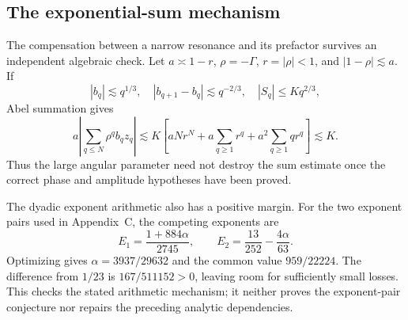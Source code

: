 \documentclass[10pt]{article}
\begin{document}
\subsection*{The exponential-sum mechanism}
The compensation between a narrow resonance and its prefactor survives an independent algebraic check. Let \(a\asymp1-r\), \(\rho=-\Gamma\), \(r=|\rho|<1\), and \(|1-\rho|\lesssim a\). If \[|b_q|\lesssim q^{1/3},\quad
 |b_{q+1}-b_q|\lesssim q^{-2/3},\quad
 |S_q|\leq Kq^{2/3},\] Abel summation gives \[a\left|\sum_{q\leq N}\rho^q b_qz_q\right|
 \lesssim K\left[
 aNr^N+a\sum_{q\geq1}r^q
       +a^2\sum_{q\geq1}qr^q\right]\lesssim K.\] Thus the large angular parameter need not destroy the sum estimate once the correct phase and amplitude hypotheses have been proved.\par
The dyadic exponent arithmetic also has a positive margin. For the two exponent pairs used in Appendix C, the competing exponents are \[E_1=\frac{1+884\alpha}{2745},
 \qquad E_2=\frac{13}{252}-\frac{4\alpha}{63}.\] Optimizing gives \(\alpha=3937/29632\) and the common value \(959/22224\). The difference from \(1/23\) is \(167/511152>0\), leaving room for sufficiently small losses. This checks the stated arithmetic mechanism; it neither proves the exponent-pair conjecture nor repairs the preceding analytic dependencies.\par
\end{document}
